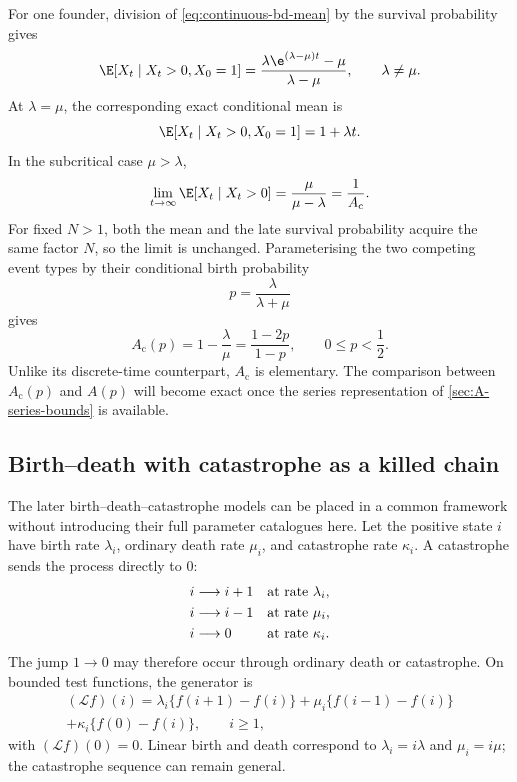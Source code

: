 For one founder, division of \cref{eq:continuous-bd-mean} by the survival
probability gives
\begin{equation}
  \E[X_t\mid X_t>0,X_0=1]
  =\frac{\lambda\e^{(\lambda-\mu)t}-\mu}{\lambda-\mu},
  \qquad \lambda\neq\mu.
  \label{eq:continuous-bd-conditional-mean}
\end{equation}
At \(\lambda=\mu\), the corresponding exact conditional mean is
\begin{equation}
  \E[X_t\mid X_t>0,X_0=1]=1+\lambda t.
  \label{eq:continuous-bd-critical-conditional-mean}
\end{equation}
In the subcritical case \(\mu>\lambda\),
\begin{equation}
  \lim_{t\to\infty}\E[X_t\mid X_t>0]
  =\frac{\mu}{\mu-\lambda}
  =\frac{1}{A_{\mathrm c}}.
  \label{eq:continuous-qsd-mean}
\end{equation}
For fixed \(N>1\), both the mean and the late survival probability acquire the same
factor \(N\), so the limit is unchanged.  Parameterising the two competing event
types by their conditional birth probability
\begin{equation}
  p=\frac{\lambda}{\lambda+\mu}
  \label{eq:continuous-p-parameterisation}
\end{equation}
gives
\begin{equation}
  A_{\mathrm c}(p)
  =1-\frac{\lambda}{\mu}
  =\frac{1-2p}{1-p},
  \qquad 0\leq p<\frac12.
  \label{eq:Ac-definition}
\end{equation}
Unlike its discrete-time counterpart, \(A_{\mathrm c}\) is elementary.  The
comparison between \(A_{\mathrm c}(p)\) and \(A(p)\) will become exact once the
series representation of \cref{sec:A-series-bounds} is available.

\subsection{Birth--death with catastrophe as a killed chain}
\label{sec:bdc-setup}

The later birth--death--catastrophe models can be placed in a common framework
without introducing their full parameter catalogues here.  Let the positive state
\(i\) have birth rate \(\lambda_i\), ordinary death rate \(\mu_i\), and catastrophe
rate \(\kappa_i\).  A catastrophe sends the process directly to \(0\):
\begin{align}
  i&\longrightarrow i+1 &&\text{at rate }\lambda_i,
  \notag\\
  i&\longrightarrow i-1 &&\text{at rate }\mu_i,
  \notag\\
  i&\longrightarrow0   &&\text{at rate }\kappa_i.
  \label{eq:bdc-rates}
\end{align}
The jump \(1\to0\) may therefore occur through ordinary death or catastrophe.  On
bounded test functions, the generator is
\begin{multline}
  (\mathcal Lf)(i)
  =\lambda_i\{f(i+1)-f(i)\}
   +\mu_i\{f(i-1)-f(i)\}\\
   +\kappa_i\{f(0)-f(i)\},
  \qquad i\geq1,
  \label{eq:bdc-generator}
\end{multline}
with \((\mathcal Lf)(0)=0\).  Linear birth and death correspond to
\(\lambda_i=i\lambda\) and \(\mu_i=i\mu\); the catastrophe sequence can remain
general.

